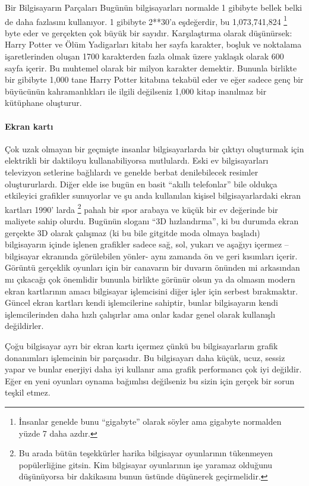 \documentclass[10pt,a5paper]{book}
\begin{document}
\begin{section}{Bir Bilgisayarın Parçaları}
Bugünün bilgisayarları normalde 1 gibibyte bellek belki de daha fazlasını kullanıyor. 1 gibibyte 2**30'a eşdeğerdir, bu 1,073,741,824 
\footnote{İnsanlar genelde bunu “gigabyte” olarak söyler ama gigabyte normalden yüzde 7 daha azdır.}
byte eder ve gerçekten çok büyük bir sayıdır. Karşılaştırma olarak düşünürsek: Harry Potter ve Ölüm Yadigarları kitabı her sayfa karakter, boşluk ve noktalama işaretlerinden oluşan 1700 karakterden fazla olmak üzere yaklaşık olarak 600 sayfa içerir. Bu muhtemel olarak bir milyon karakter demektir. Bununla birlikte bir gibibyte 1,000 tane Harry Potter kitabına tekabül eder ve eğer sadece genç bir büyücünün kahramanlıkları ile ilgili değilseniz 1,000 kitap inanılmaz bir kütüphane oluşturur.
\paragraph{Ekran kartı}{Çok uzak olmayan bir geçmişte insanlar bilgisayarlarda bir çıktıyı oluşturmak için elektrikli bir daktiloyu kullanabiliyorsa mutlulardı. Eski ev bilgisayarları televizyon setlerine bağlılardı ve genelde berbat denilebilecek resimler oluştururlardı. Diğer elde ise bugün en basit “akıllı telefonlar” bile oldukça etkileyici grafikler sunuyorlar ve şu anda kullanılan kişisel bilgisayarlardaki ekran kartları 1990' larda 
\footnote{Bu arada bütün teşekkürler harika bilgisayar oyunlarının tükenmeyen popülerliğine gitsin. Kim bilgisayar oyunlarının işe yaramaz olduğunu düşünüyorsa bir dakikasını bunun üstünde düşünerek geçirmelidir.}
pahalı bir spor arabaya ve küçük bir ev değerinde bir maliyete sahip olurdu. Bugünün sloganı “3D hızlandırma”, ki bu durumda ekran gerçekte 3D olarak çalışmaz (ki bu bile gitgitde moda olmaya başladı) bilgisayarın içinde işlenen grafikler sadece sağ, sol, yukarı ve aşağıyı içermez – bilgisayar ekranında görülebilen yönler- aynı zamanda ön ve geri kısımları içerir. Görüntü gerçeklik oyunları için bir canavarın bir duvarın önünden mi arkasından mı çıkacağı çok önemlidir bununla birlikte görünür olsun ya da olmasın modern ekran kartlarının amacı bilgisayar işlemcisini diğer işler için serbest bırakmaktır.  Güncel ekran kartları kendi işlemcilerine sahiptir, bunlar bilgisayarın kendi işlemcilerinden daha hızlı çalışırlar ama onlar kadar genel olarak kullanışlı değildirler.}

Çoğu bilgisayar ayrı bir ekran kartı içermez çünkü bu bilgisayarların grafik donanımları işlemcinin bir parçasıdır. Bu bilgisayarı daha küçük, ucuz, sessiz yapar ve bunlar enerjiyi daha iyi kullanır ama grafik performancı çok iyi değildir. Eğer en yeni oyunları oynama bağımlısı değilseniz bu sizin için gerçek bir sorun teşkil etmez.

\end{section}
\end{document}
